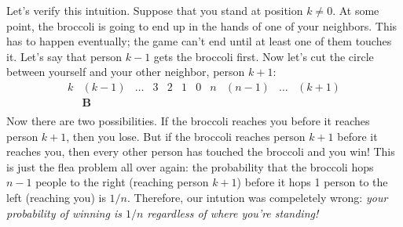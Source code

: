 Let's verify this intuition.  Suppose that you stand at position $k
\neq 0$.  At some point, the broccoli is going to end up in the hands
of one of your neighbors.  This has to happen eventually; the game
can't end until at least one of them touches it.  Let's say that
person $k - 1$ gets the broccoli first.  Now let's cut the circle
between yourself and your other neighbor, person $k+1$:
%
\[
\begin{array}{cccccccccccccc}
k & (k-1) & \ldots & 3 & 2 & 1 & 0 & n & (n-1) & \ldots & (k+1) \\
  & \mathbf{B} \\
\end{array}
\]
%
Now there are two possibilities.  If the broccoli reaches you before
it reaches person $k+1$, then you lose.  But if the broccoli reaches
person $k+1$ before it reaches you, then every other person has
touched the broccoli and you win!  This is just the flea problem all
over again: the probability that the broccoli hops $n-1$ people to the
right (reaching person $k+1$) before it hops 1 person to the left
(reaching you) is $1 / n$.  Therefore, our intution was compeletely
wrong: \emph{your probability of winning is $1 / n$ regardless of
where you're standing!}


\endinput
